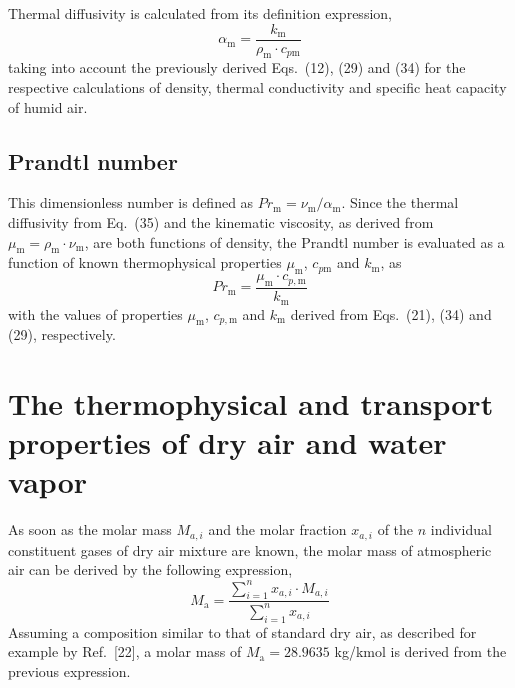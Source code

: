 \documentclass[11pt]{article}
\begin{document}
Thermal diffusivity is calculated from its definition expression,
\begin{equation}
\alpha_\mathrm{m} = \frac{k_\mathrm{m}}
  {\rho_\mathrm{m}\cdot c_{p\mathrm{m}}}
\end{equation}
taking into account the previously derived Eqs.~(12), (29) and (34) for
the respective calculations of density, thermal conductivity and
specific heat capacity of humid air.

\subsection{Prandtl number}

This dimensionless number is defined as
$Pr_\mathrm{m} = \nu_\mathrm{m}/\alpha_\mathrm{m}$. Since the thermal
diffusivity from Eq.~(35) and the kinematic viscosity, as derived from
$\mu_\mathrm{m} = \rho_\mathrm{m}\cdot\nu_\mathrm{m}$, are both
functions of density, the Prandtl number is evaluated as a function of
known thermophysical properties $\mu_\mathrm{m}$, $c_{p\mathrm{m}}$
and $k_\mathrm{m}$, as
\begin{equation}
Pr_\mathrm{m} = \frac{\mu_\mathrm{m}\cdot c_{p,\mathrm{m}}}
                     {k_\mathrm{m}}
\end{equation}
with the values of properties $\mu_\mathrm{m}$, $c_{p,\mathrm{m}}$ and
$k_\mathrm{m}$ derived from Eqs.~(21), (34) and (29), respectively.

\section{The thermophysical and transport properties of dry air and
         water vapor}


\noindent As soon as the molar mass $M_{a,i}$ and the molar fraction
$x_{a,i}$ of the $n$ individual constituent gases of dry air mixture
are known, the molar mass of atmospheric air can be derived by the
following expression,
\begin{equation}
M_\mathrm{a} = \frac{\sum_{i=1}^{n} x_{a,i}\cdot M_{a,i}}
                    {\sum_{i=1}^{n} x_{a,i}}
\end{equation}
Assuming a composition similar to that of standard dry air, as
described for example by Ref.~[22], a molar mass of
$M_\mathrm{a} = 28.9635$ kg/kmol is derived from the previous
expression.
\end{document}
